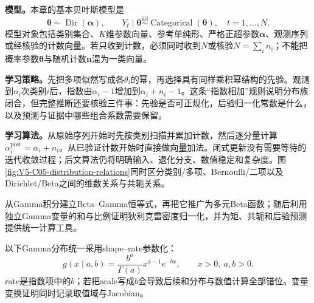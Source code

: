 \label{struct:V5-C05-CH08}
\textbf{模型。}本章的基本贝叶斯模型是
\begin{equation}\label{eq:V5-C05-bayes-model}
\boldsymbol\theta\sim\operatorname{Dir}(\boldsymbol\alpha),
\qquad
Y_t\mid\boldsymbol\theta\overset{\mathrm{iid}}{\sim}
\operatorname{Categorical}(\boldsymbol\theta),
\quad t=1,\ldots,N.
\end{equation}
模型对象包括类别集合、$K$维参数向量、参考单纯形、严格正超参数$\boldsymbol\alpha$、观测序列或经核验的计数向量。若只收到计数，必须同时收到$N$或核验$N=\sum_i n_i$；不能把概率参数$\boldsymbol\theta$与随机计数$\boldsymbol n$混为一类向量。

\label{struct:V5-C05-CH09}
\textbf{学习策略。}先把多项似然写成各$\theta_i$的幂，再选择具有同样乘积幂结构的先验。观测到$n_i$次类别$i$后，指数由$\alpha_i-1$增加到$\alpha_i+n_i-1$。这条“指数相加”规则说明分布族闭合，但完整推断还要核验三件事：先验是否可正规化，后验归一化常数是什么，以及预测与证据中哪些组合系数需要保留。

\label{struct:V5-C05-CH10}
\textbf{学习算法。}从原始序列开始时先按类别扫描并累加计数，然后逐分量计算$\alpha_i^{\mathrm{post}}=\alpha_i+n_i$。从已验证计数开始时直接做向量加法。闭式更新没有需要等待的迭代收敛过程；后文算法仍将明确输入、退化分支、数值稳定和复杂度。图\ref{fig:V5-C05-distribution-relations}同时区分类别/多项、Bernoulli/二项以及Dirichlet/Beta之间的维数关系与共轭关系。



\label{struct:V5-C05-CH11}

\begin{derivationgoalbox}
从Gamma积分建立Beta--Gamma恒等式，再把它推广为多元Beta函数；随后利用独立Gamma变量的和与比例证明狄利克雷密度归一化，并为矩、共轭和后验预测提供统一计算工具。
\end{derivationgoalbox}

\begin{derivationprepbox}
以下Gamma分布统一采用shape--rate参数化：
\[
g(x\mid a,b)=\frac{b^a}{\Gamma(a)}x^{a-1}e^{-bx},
\qquad x>0,\ a,b>0.
\]
rate是指数项中的$b$；若把scale写成$b$会导致后续和分布与数值计算全部错位。变量变换证明同时记录取值域与Jacobian。
\end{derivationprepbox}

